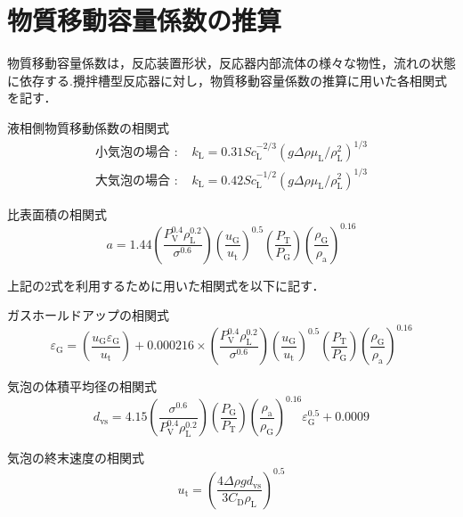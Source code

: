 \documentclass[a4j]{jsreport}
\begin{document}
\section{物質移動容量係数の推算}
物質移動容量係数は，反応装置形状，反応器内部流体の様々な物性，流れの状態に依存する.攪拌槽型反応器に対し，物質移動容量係数の推算に用いた各相関式を記す．

\noindent 液相側物質移動係数の相関式\cite{化工便覧}
\begin{align}
  \text{小気泡の場合 : }　&k_\mathrm{L} = 0.31Sc_\mathrm{L}^{-2/3}(g \varDelta \rho \mu_\mathrm{L}/\rho_\mathrm{L}^2)^{1/3} \\
  \text{大気泡の場合 : }　&k_\mathrm{L} = 0.42Sc_\mathrm{L}^{-1/2}(g \varDelta \rho \mu_\mathrm{L}/\rho_\mathrm{L}^2)^{1/3}
\end{align}

\noindent 比表面積の相関式\cite{化工便覧}
\begin{equation}
    a = 1.44 \left( \frac{P_\mathrm{V}^{0.4} \rho_\mathrm{L}^{0.2} }{ \sigma^{0.6}} \right) \left( \frac{u_\mathrm{G}}{u_\mathrm{t}} \right)^{0.5} \left( \frac{P_\mathrm{T}}{P_\mathrm{G}} \right) \left( \frac{\rho_\mathrm{G}}{\rho_\mathrm{a}} \right)^{0.16}
\end{equation}

上記の2式を利用するために用いた相関式を以下に記す．

\noindent ガスホールドアップの相関式\cite{化工便覧}
\begin{equation}
    \varepsilon_{{\mathrm G}} = \left( \frac{u_{{\mathrm G}}\varepsilon_{{\mathrm G}}}{u_{{\mathrm t}}} \right) + 0.000216 \times \left( \frac{P_\mathrm{V}^{0.4} \rho_\mathrm{L}^{0.2} }{ \sigma^{0.6}} \right) \left( \frac{u_\mathrm{G}}{u_\mathrm{t}} \right)^{0.5} \left( \frac{P_\mathrm{T}}{P_\mathrm{G}} \right) \left( \frac{\rho_\mathrm{G}}{\rho_\mathrm{a}} \right)^{0.16}
\end{equation}

\noindent 気泡の体積平均径の相関式\cite{化工便覧}
\begin{equation}
    d_\mathrm{vs} = 4.15 \left( \frac{\sigma^{0.6}}{P_\mathrm{V}^{0.4} \rho_\mathrm{L}^{0.2}} \right) \left( \frac{P_\mathrm{G}}{P_\mathrm{T}} \right) \left( \frac{\rho_\mathrm{a}}{\rho_\mathrm{G}} \right) ^{0.16} \varepsilon_\mathrm{G}^{0.5} + 0.0009
\end{equation}

\noindent 気泡の終末速度の相関式\cite{化工便覧}
\begin{equation}
    u_\mathrm{t} = \left( \frac{4\varDelta \rho g d_\mathrm{vs}}{3C_\mathrm{D} \rho_\mathrm{L}} \right)^{0.5}
\end{equation}
\end{document}
